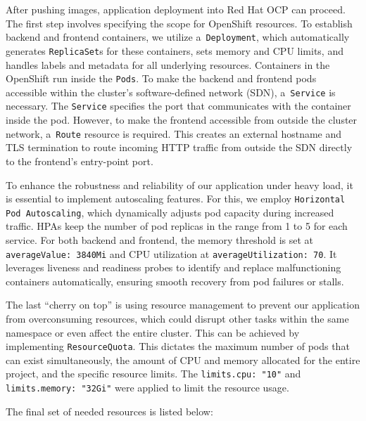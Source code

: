After pushing images, application deployment into Red Hat OCP can proceed. The first step involves specifying the scope for OpenShift resources. To establish backend and frontend containers, we utilize a~\texttt{Deployment}, which automatically generates \texttt{ReplicaSet}s  for these containers, sets memory and CPU limits, and handles labels and metadata for all underlying resources. Containers in the OpenShift run inside the \texttt{Pods}. To make the backend and frontend pods accessible within the cluster's software-defined network (SDN), a~\texttt{Service} is necessary. The \texttt{Service} specifies the port that communicates with the container inside the pod. However, to make the frontend accessible from outside the cluster network, a~\texttt{Route} resource is required. This creates an external hostname and TLS termination to route incoming HTTP traffic from outside the SDN directly to the frontend's entry-point port.

To enhance the robustness and reliability of our application under heavy load, it is essential to implement autoscaling features. For this, we employ \texttt{Horizontal Pod Autoscaling}, which dynamically adjusts pod capacity during increased traffic. HPAs keep the number of pod replicas in the range from 1 to 5 for each service. For both backend and frontend, the memory threshold is set at \texttt{averageValue: 3840Mi} and CPU utilization at \texttt{averageUtilization: 70}. It leverages liveness and readiness probes to identify and replace malfunctioning containers automatically, ensuring smooth recovery from pod failures or stalls.

\label{resquota}
The last \enquote{cherry on top} is using resource management to prevent our application from overconsuming resources, which could disrupt other tasks within the same namespace or even affect the entire cluster. This can be achieved by implementing \texttt{ResourceQuota}. This dictates the maximum number of pods that can exist simultaneously, the amount of CPU and memory allocated for the entire project, and the specific resource limits. The \texttt{limits.cpu: "10"} and \texttt{limits.memory: "32Gi"} were applied to limit the resource usage.

The final set of needed resources is listed below: 


